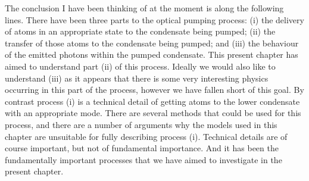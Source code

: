 The conclusion I have been thinking of at the moment is along the following lines.  There have been three parts to the optical pumping process: (i) the delivery of atoms in an appropriate state to the condensate being pumped; (ii) the transfer of those atoms to the condensate being pumped; and (iii) the behaviour of the emitted photons within the pumped condensate.  This present chapter has aimed to understand part (ii) of this process.  Ideally we would also like to understand (iii) as it appears that there is some very interesting physics occurring in this part of the process, however we have fallen short of this goal.  By contrast process (i) is a technical detail of getting atoms to the lower condensate with an appropriate mode.  There are several methods that could be used for this process, and there are a number of arguments why the models used in this chapter are unsuitable for fully describing process (i).  Technical details are of course important, but not of fundamental importance.  And it has been the fundamentally important processes that we have aimed to investigate in the present chapter.
